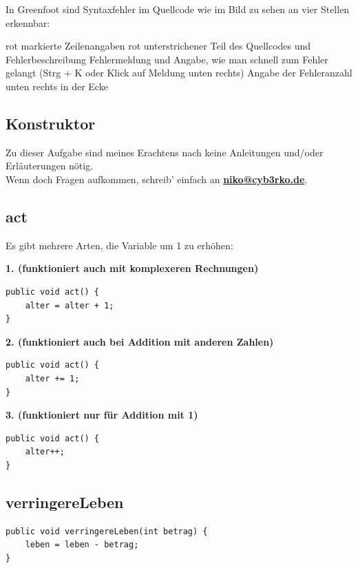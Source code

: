 \documentclass{scrartcl}   %
\begin{document}
In Greenfoot sind Syntaxfehler im Quellcode wie im Bild zu sehen an vier Stellen erkennbar:

\begin{itemize}
    \barrow rot markierte Zeilenangaben
    \barrow rot unterstrichener Teil des Quellcodes und Fehlerbeschreibung
    \barrow Fehlermeldung und Angabe, wie man schnell zum Fehler gelangt (Strg + K oder Klick auf Meldung unten rechts)
    \barrow Angabe der Fehleranzahl unten rechts in der Ecke
\end{itemize}

\subsection{Konstruktor}

Zu dieser Aufgabe sind meines Erachtens nach keine Anleitungen und/oder Erläuterungen nötig.\\
Wenn doch Fragen aufkommen, schreib' einfach an \textbf{\href{mailto:niko@cyb3rko.de}{niko@cyb3rko.de}}.

\subsection{act}

Es gibt mehrere Arten, die Variable um 1 zu erhöhen:

\textbf{1. (funktioniert auch mit komplexeren Rechnungen)}
\begin{lstlisting}
public void act() {
    alter = alter + 1;
}
\end{lstlisting}

\textbf{2. (funktioniert auch bei Addition mit anderen Zahlen)}
\begin{lstlisting}
public void act() {
    alter += 1;
}
\end{lstlisting}

\textbf{3. (funktioniert nur für Addition mit 1)}
\begin{lstlisting}
public void act() {
    alter++;
}
\end{lstlisting}

\subsection{verringereLeben}

\begin{lstlisting}
public void verringereLeben(int betrag) {
    leben = leben - betrag;
}
\end{lstlisting}
\end{document}
